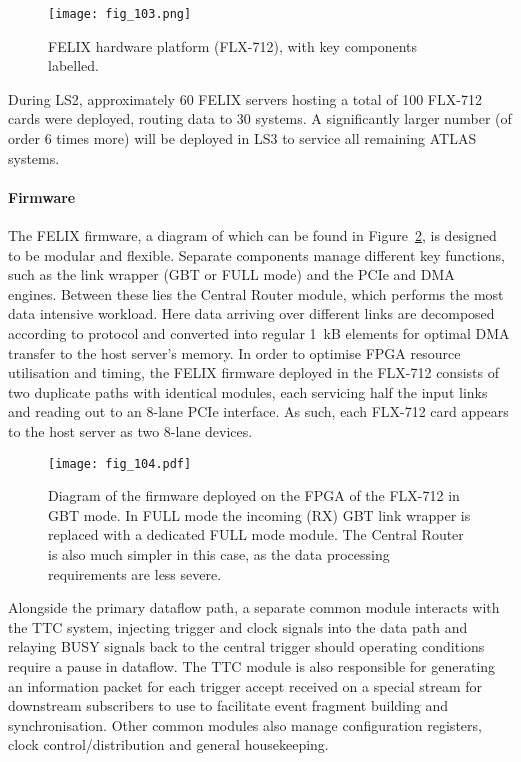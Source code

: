 \documentclass[cernpreprint, atlasdraft=false, UKenglish,british,orcidlogo, texmf, orcidlogo]{atlasdoc}
\begin{document}
\begin{figure}[htbp!]
\centerline{\texttt{[image: fig\_103.png]}}
\caption{\RunThr \gls{FELIX} hardware platform (FLX-712), with key components labelled.}
\label{fig:TDAQ_DAQHLT_flx712}
\end{figure}
 
During \gls{LS2},
approximately 60 \gls{FELIX} servers hosting
a total of 100 FLX-712 cards
were
deployed, routing data to 30 \swrod systems. A
significantly larger number (of order 6 times more) will be deployed in \gls{LS3} to service all remaining ATLAS systems.
 
\paragraph{ Firmware}
 
The \gls{FELIX} firmware, a diagram of which can be found in Figure~\ref{fig:TDAQ_DAQHLT_flx-712-firmware}, is designed to be modular and flexible. Separate components manage different key functions, such as the link wrapper (GBT or FULL mode) and the \gls{PCIe}  and \gls{DMA}~\cite{JEFFERS2013243} engines. Between these lies the Central Router module, which performs the most data intensive workload. Here data arriving over different links are decomposed according to protocol and converted into regular \SI{1}{kB} elements for optimal \gls{DMA} transfer to the host server's memory. In order to optimise \gls{FPGA} resource utilisation and timing, the \gls{FELIX} firmware deployed in the FLX-712 consists of two duplicate paths with identical modules, each servicing half the input links and reading out to an 8-lane \gls{PCIe}  interface. As such, each FLX-712 card appears to the host server as two 8-lane devices.
 
\begin{figure}[htbp!]
\centering
\texttt{[image: fig\_104.pdf]}
\caption{Diagram of the firmware deployed on the \gls{FPGA} of the FLX-712 in GBT mode. In FULL mode the incoming (RX) GBT link wrapper is replaced with a dedicated FULL mode module. The Central Router is also much simpler in this case, as the data processing requirements are less severe.}
\label{fig:TDAQ_DAQHLT_flx-712-firmware}
\end{figure}
 
Alongside the primary dataflow path, a separate common module interacts with the \gls{TTC} system, injecting trigger and clock signals into the data path and relaying BUSY signals back to the central trigger should operating conditions require a pause in dataflow. The \gls{TTC} module is also responsible for generating an information packet for each trigger accept received on a special stream for downstream subscribers to use to facilitate event fragment building and synchronisation. Other common modules also manage configuration registers, clock control/distribution and general housekeeping.
 
\end{document}
